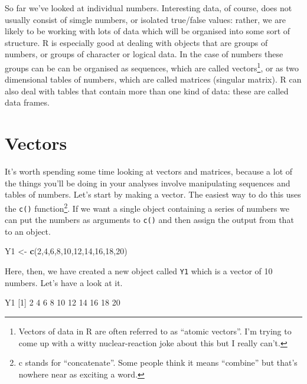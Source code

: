 \documentclass[
]{book}
\newenvironment{Shaded}{\begin{snugshade}}{\end{snugshade}}
\newcommand{\DecValTok}[1]{\textcolor[rgb]{0.00,0.00,0.81}{#1}}
\newcommand{\KeywordTok}[1]{\textcolor[rgb]{0.13,0.29,0.53}{\textbf{#1}}}
\newcommand{\NormalTok}[1]{#1}
\newcommand{\StringTok}[1]{\textcolor[rgb]{0.31,0.60,0.02}{#1}}
\begin{document}
So far we've looked at individual numbers. Interesting data, of course, does not usually consist of simgle numbers, or isolated true/false values: rather, we are likely to be working with lots of data which will be organised into some sort of structure. R is especially good at dealing with objects that are groups of numbers, or groups of character or logical data. In the case of numbers these groups can be can be organised as sequences, which are called vectors\footnote{Vectors of data in R are often referred to as ``atomic vectors''. I'm trying to come up with a witty nuclear-reaction joke about this but I really can't.}, or as two dimensional tables of numbers, which are called matrices (singular matrix). R can also deal with tables that contain more than one kind of data: these are called data frames.

\hypertarget{vectors}{%
\section{Vectors}\label{vectors}}

It's worth spending some time looking at vectors and matrices, because a lot of the things you'll be doing in your analyses involve manipulating sequences and tables of numbers. Let's start by making a vector. The easiest way to do this uses the \texttt{c()} function\footnote{c stands for ``concatenate''. Some people think it means ``combine'' but that's nowhere near as exciting a word.}. If we want a single object containing a series of numbers we can put the numbers as arguments to \texttt{c()} and then assign the output from that to an object.

\begin{Shaded}
\begin{Highlighting}[]
\NormalTok{Y1 <-}\StringTok{ }\KeywordTok{c}\NormalTok{(}\DecValTok{2}\NormalTok{,}\DecValTok{4}\NormalTok{,}\DecValTok{6}\NormalTok{,}\DecValTok{8}\NormalTok{,}\DecValTok{10}\NormalTok{,}\DecValTok{12}\NormalTok{,}\DecValTok{14}\NormalTok{,}\DecValTok{16}\NormalTok{,}\DecValTok{18}\NormalTok{,}\DecValTok{20}\NormalTok{)}
\end{Highlighting}
\end{Shaded}

Here, then, we have created a new object called \texttt{Y1} which is a vector of 10 numbers. Let's have a look at it.

\begin{Shaded}
\begin{Highlighting}[]
\NormalTok{Y1}
\NormalTok{ [}\DecValTok{1}\NormalTok{]  }\DecValTok{2}  \DecValTok{4}  \DecValTok{6}  \DecValTok{8} \DecValTok{10} \DecValTok{12} \DecValTok{14} \DecValTok{16} \DecValTok{18} \DecValTok{20}
\end{Highlighting}
\end{Shaded}
\end{document}
